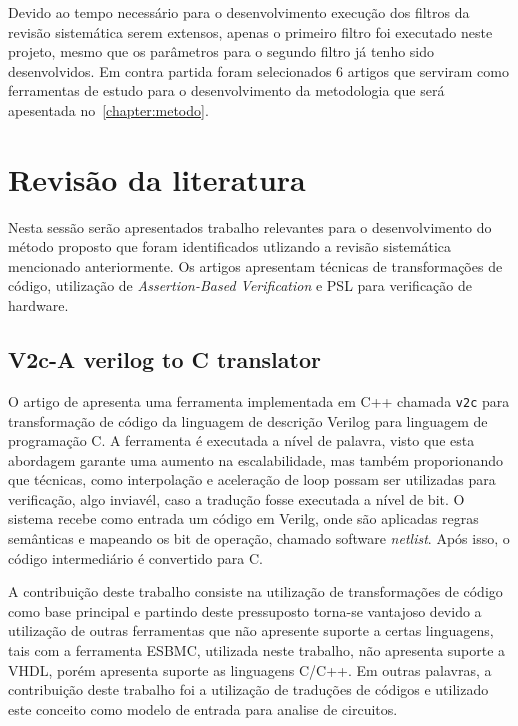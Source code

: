 \par
Devido ao tempo necessário para o desenvolvimento execução dos filtros da revisão sistemática serem extensos, apenas o primeiro filtro foi executado neste projeto, mesmo que os parâmetros para o segundo filtro já tenho sido desenvolvidos. Em contra partida foram selecionados $6$ artigos que serviram como ferramentas de estudo para o desenvolvimento da metodologia que será apesentada no~\autoref{chapter:metodo}.

\section{Revisão da literatura}
Nesta sessão serão apresentados trabalho relevantes para o desenvolvimento do método proposto que foram identificados utlizando a revisão sistemática mencionado anteriormente. Os artigos apresentam técnicas de transformações de código, utilização de \textit{Assertion-Based Verification} e PSL para verificação de hardware.

\subsection{V2c-A verilog to C translator}

O artigo de \citeauthor{mukherjee2016v2c} apresenta uma ferramenta implementada em C++ chamada \texttt{v2c} para transformação de código da linguagem de descrição Verilog para linguagem de programação C. A ferramenta é executada a nível de palavra, visto que esta abordagem garante uma aumento na escalabilidade, mas também proporionando que técnicas, como interpolação e aceleração de loop possam ser utilizadas para verificação, algo inviavél, caso a tradução fosse executada a nível de bit. O sistema recebe como entrada um código em Verilg, onde são aplicadas regras semânticas e mapeando os bit de operação, chamado software \textit{netlist}. Após isso, o código intermediário é convertido para C.

\par
A contribuição deste trabalho consiste na utilização de transformações de código como base principal e partindo deste pressuposto torna-se vantajoso devido a utilização de outras ferramentas que não apresente suporte a certas linguagens, tais com a ferramenta ESBMC, utilizada neste trabalho, não apresenta suporte a VHDL, porém apresenta suporte as linguagens C/C++. Em outras palavras, a contribuição deste trabalho foi a utilização de traduções de códigos e utilizado este conceito como modelo de entrada para analise de circuitos.

